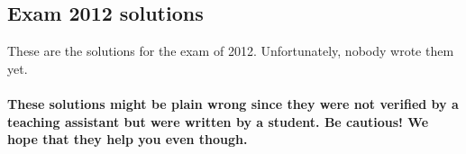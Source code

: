\documentclass[main]{subfiles}
\begin{document}

\subsection{Exam 2012 solutions}
These are the solutions for the exam of 2012. Unfortunately, nobody wrote them yet.\\\\
\textbf{These solutions might be plain wrong since they were not verified by a teaching assistant but were written by a student. Be cautious! We hope that they help you even though.}

\end{document}
